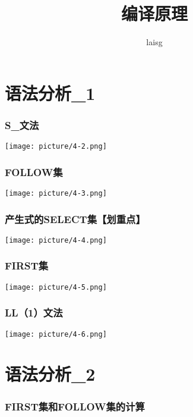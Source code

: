 \documentclass[UTF8]{article}
\title{编译原理}
\author{laisg}
\begin{document}
 \maketitle
 
 \part{语法分析\_1}%
 \section{S\_文法}%
 \label{sec:s_文法}

 \texttt{[image: picture/4-2.png]}

 \section{FOLLOW集}%
 \label{sec:follow集}

 \texttt{[image: picture/4-3.png]}

 \section{产生式的SELECT集【\textbf{划重点}】}%
 \label{sec:产生式的select集_划重点_}

 \texttt{[image: picture/4-4.png]}

 \section{FIRST集}%
 \label{sec:first集}

 \texttt{[image: picture/4-5.png]}

 \section{LL（1）文法}%
 \label{sec:ll_1_文法}

 \texttt{[image: picture/4-6.png]}
 
 \part{语法分析\_2}%
 \label{prt:语法分析_2}
 \section{FIRST集和FOLLOW集的计算}%
 \label{sec:first集和follow集的计算}
 
\end{document}
